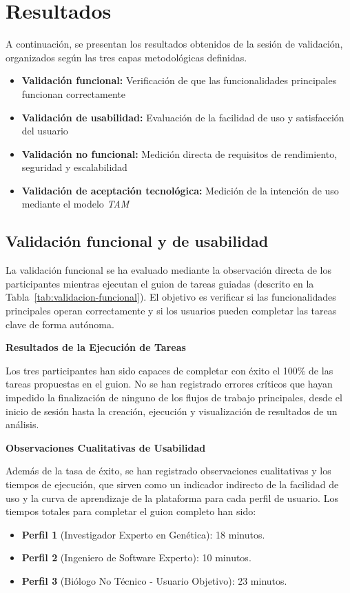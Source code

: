 \section{Resultados}
A continuación, se presentan los resultados obtenidos de la sesión de validación, organizados según las tres capas metodológicas definidas.
\begin{itemize}
    \item \textbf{Validación funcional:} Verificación de que las funcionalidades principales funcionan correctamente
    \item \textbf{Validación de usabilidad:} Evaluación de la facilidad de uso y satisfacción del usuario
    \item \textbf{Validación no funcional:} Medición directa de requisitos de rendimiento, seguridad y escalabilidad
    \item \textbf{Validación de aceptación tecnológica:} Medición de la intención de uso mediante el modelo \textit{TAM}
\end{itemize}

\subsection{Validación funcional y de usabilidad}

La validación funcional se ha evaluado mediante la observación directa de los participantes mientras ejecutan el guion de tareas guiadas (descrito en la Tabla~\ref{tab:validacion-funcional}). El objetivo es verificar si las funcionalidades principales operan correctamente y si los usuarios pueden completar las tareas clave de forma autónoma.

\textbf{Resultados de la Ejecución de Tareas}

Los tres participantes han sido capaces de completar con éxito el 100\% de las tareas propuestas en el guion. No se han registrado errores críticos que hayan impedido la finalización de ninguno de los flujos de trabajo principales, desde el inicio de sesión hasta la creación, ejecución y visualización de resultados de un análisis.

\textbf{Observaciones Cualitativas de Usabilidad}

Además de la tasa de éxito, se han registrado observaciones cualitativas y los tiempos de ejecución, que sirven como un indicador indirecto de la facilidad de uso y la curva de aprendizaje de la plataforma para cada perfil de usuario. Los tiempos totales para completar el guion completo han sido:
\begin{itemize}
\item \textbf{Perfil 1} (Investigador Experto en Genética): 18 minutos.
\item \textbf{Perfil 2} (Ingeniero de Software Experto): 10 minutos.
\item \textbf{Perfil 3} (Biólogo No Técnico - Usuario Objetivo): 23 minutos.
\end{itemize}

